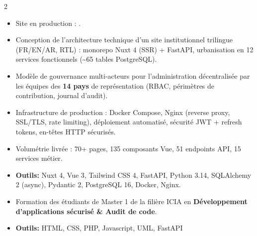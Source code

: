 \documentclass[10pt,a4paper,ragged2e,withhyper]{altacv}
\begin{document}
\begin{paracol}{2}
            \begin{itemize}
                \item Site en production : .
                \item Conception de l'architecture technique d'un site institutionnel trilingue (FR/EN/AR, RTL) : monorepo Nuxt 4 (SSR) + FastAPI, urbanisation en 12 services fonctionnels (\textasciitilde65 tables PostgreSQL).
                \item Modèle de gouvernance multi-acteurs pour l'administration décentralisée par les équipes des \textbf{14 pays} de représentation (RBAC, périmètres de contribution, journal d'audit).
                \item Infrastructure de production : Docker Compose, Nginx (reverse proxy, SSL/TLS, rate limiting), déploiement automatisé, sécurité JWT + refresh tokens, en-têtes HTTP sécurisés.
                \item Volumétrie livrée : 70+ pages, 135 composants Vue, 51 endpoints API, 15 services métier.
                \item \textcolor{SecondaryColor}{\textbf{Outils: }} Nuxt 4, Vue 3, Tailwind CSS 4, FastAPI, Python 3.14, SQLAlchemy 2 (async), Pydantic 2, PostgreSQL 16, Docker, Nginx.
            \end{itemize}
            \divider

            \newpage

            \begin{itemize}
                \item Formation des étudiants de Master 1 de la filière ICIA en {\textbf{Développement d’applications sécurisé \& Audit de code}}.
                \item \textcolor{SecondaryColor}{\textbf{Outils: }} HTML, CSS, PHP, Javascript, UML, FastAPI
            \end{itemize}
            \divider


\end{paracol}
\end{document}
